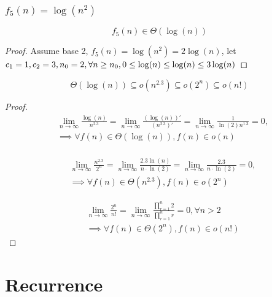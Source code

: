 \documentclass{article}
\begin{document}
\subsubsection*{$f_5(n) = \log(n^{2})$}
\[f_5(n) \in \Theta(\log(n))\]
\begin{proof}
    Assume base 2, $f_5(n) = \log(n^2) = 2\log(n)$, let $c_1 = 1, c_2 = 3, n_0 = 2, \\ \forall n \geq n_0, 0 \leq \log(n) \leq \log(n) \leq 3\log(n)$
\end{proof}
\[\Theta(\log(n)) \subseteq o(n^{2.3}) \subseteq o(2^n) \subseteq o(n!)\]
\begin{proof}
    \begin{align*}
        & \lim_{n \rightarrow \infty} \frac{\log(n)}{n^{2.3}} = \lim_{n \rightarrow \infty} \frac{(\log(n))'}{(n^{2.3})'} = \lim_{n \rightarrow \infty} \frac{1}{\ln(2)n^{1.3}} = 0, \\
        & \implies \forall f(n) \in \Theta(\log(n)), f(n) \in o(n)\\
    \end{align*}

    \begin{align*}
        & \lim_{n \rightarrow \infty} \frac{n^{2.3}}{2^n} = \lim_{n \rightarrow \infty} \frac{2.3\ln(n)}{n\cdot \ln(2)} = \lim_{n \rightarrow \infty} \frac{2.3}{n\cdot \ln(2)} = 0, \\
        & \implies \forall f(n) \in \Theta(n^{2.3}), f(n) \in o(2^n)
    \end{align*}

    \begin{align*}
        & \lim_{n \rightarrow \infty} \frac{2^n}{n!} = \lim_{n \rightarrow \infty} \frac{\prod_{r=1}^{n}2}{\prod_{r=1}^{n} r} = 0,  \forall n > 2\\
        & \implies \forall f(n) \in \Theta(2^n), f(n) \in o(n!)
    \end{align*}

\end{proof}



\section{Recurrence}
\end{document}
